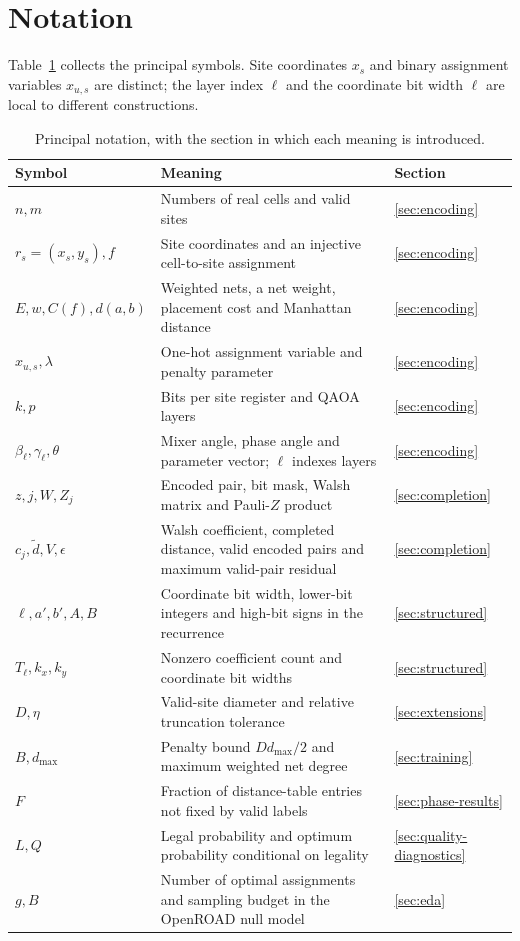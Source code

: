 \documentclass[manuscript,screen,review]{acmart}
\begin{document}
\section{Notation}
\label{sec:notation}
Table~\ref{tab:notation} collects the principal symbols. Site coordinates
$x_s$ and binary assignment variables $x_{u,s}$ are distinct; the layer index
$\ell$ and the coordinate bit width $\ell$ are local to different constructions.

\begin{table}[H]
\centering\small
\caption{Principal notation, with the section in which each meaning is introduced.}
\label{tab:notation}
\begin{tabular}{lp{.62\linewidth}l}
\toprule
Symbol & Meaning & Section \\
\midrule
$n,m$ & Numbers of real cells and valid sites & \ref{sec:encoding} \\
$r_s=(x_s,y_s), f$ & Site coordinates and an injective cell-to-site assignment & \ref{sec:encoding} \\
$E,w,C(f),d(a,b)$ & Weighted nets, a net weight, placement cost and Manhattan distance & \ref{sec:encoding} \\
$x_{u,s},\lambda$ & One-hot assignment variable and penalty parameter & \ref{sec:encoding} \\
$k,p$ & Bits per site register and QAOA layers & \ref{sec:encoding} \\
$\beta_\ell,\gamma_\ell,\theta$ & Mixer angle, phase angle and parameter vector; $\ell$ indexes layers & \ref{sec:encoding} \\
$z,j,W,Z_j$ & Encoded pair, bit mask, Walsh matrix and Pauli-$Z$ product & \ref{sec:completion} \\
$c_j,\widetilde d,V,\epsilon$ & Walsh coefficient, completed distance, valid encoded pairs and maximum valid-pair residual & \ref{sec:completion} \\
$\ell,a',b',A,B$ & Coordinate bit width, lower-bit integers and high-bit signs in the recurrence & \ref{sec:structured} \\
$T_\ell,k_x,k_y$ & Nonzero coefficient count and coordinate bit widths & \ref{sec:structured} \\
$D,\eta$ & Valid-site diameter and relative truncation tolerance & \ref{sec:extensions} \\
$B,d_{\max}$ & Penalty bound $Dd_{\max}/2$ and maximum weighted net degree & \ref{sec:training} \\
$F$ & Fraction of distance-table entries not fixed by valid labels & \ref{sec:phase-results} \\
$L,Q$ & Legal probability and optimum probability conditional on legality & \ref{sec:quality-diagnostics} \\
$g,B$ & Number of optimal assignments and sampling budget in the OpenROAD null model & \ref{sec:eda} \\
\bottomrule
\end{tabular}
\end{table}



\end{document}
